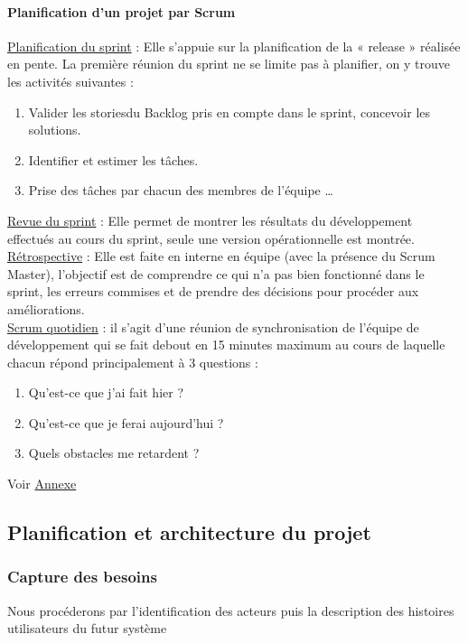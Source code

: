 \documentclass{article}
\begin{document}
\paragraph{Planification d’un projet par Scrum}
\uline{Planification du sprint} : Elle s’appuie sur la planification de la « release » réalisée en pente. La première réunion du sprint ne se limite pas à planifier, on y trouve les activités suivantes :
\begin{enumerate}
\item Valider les \guillemotleft stories\guillemotright du Backlog pris en compte dans le sprint, concevoir les solutions.
\item Identifier et estimer les tâches.
\item Prise des tâches par chacun des membres de l’équipe …
\end{enumerate}
\uline{Revue du sprint} : Elle permet de montrer les résultats du développement effectués au cours du sprint, seule une version opérationnelle est montrée.\\
\uline{Rétrospective} : Elle est faite en interne en équipe (avec la présence du Scrum Master), l’objectif est de comprendre ce qui n’a pas bien fonctionné dans le sprint, les erreurs commises et de prendre des décisions pour procéder aux améliorations.\\
\uline{Scrum quotidien} : il s’agit d’une réunion de synchronisation de l’équipe de développement qui se fait debout en 15 minutes maximum au cours de laquelle chacun répond principalement à 3 questions :
\begin{enumerate}
\item Qu’est-ce que j’ai fait hier ?
\item Qu’est-ce que je ferai aujourd’hui ?
\item Quels obstacles me retardent ?
\end{enumerate}
Voir \hyperref[sec:hello1]{Annexe} 
\subsection{Planification et architecture du projet}
\subsubsection{Capture des besoins}
Nous procéderons par l’identification des acteurs puis la description des histoires utilisateurs du futur système
\end{document}
